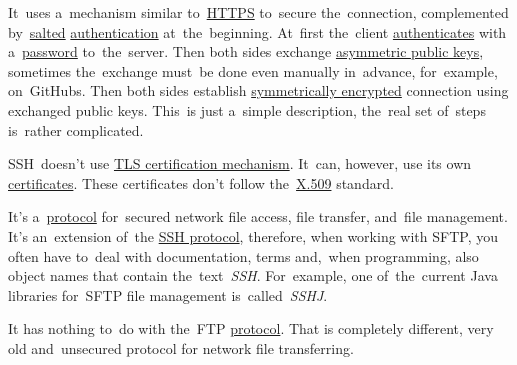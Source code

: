 It~uses a~mechanism similar to~\hyperref[https]{HTTPS} to~secure the~connection, complemented by~\hyperref[salt]{salted} \hyperref[authenticationauthorization]{authentication} at~the~beginning.
At~first the~client \hyperref[authenticationauthorization]{authenticates} with a~\hyperref[keypassword]{password} to~the~server.
Then both sides exchange \hyperref[asymmetriccryptography]{asymmetric public keys}, sometimes the~exchange must~be done even manually in~advance, for~example, on~GitHubs.
Then both sides establish \hyperref[symmetriccryptography]{symmetrically encrypted} connection using exchanged public keys.
This~is just a~simple description, the~real set of~steps is~rather complicated.

SSH~doesn't use \hyperref[tls]{TLS certification mechanism}.
It~can, however, use its own \hyperref[certificate]{certificates}.
These certificates don't follow the~\hyperref[x509]{\mbox{X.509}} standard.

\label{sftp}
It's a~\hyperref[protocolstandard]{protocol} for~secured network file access, file transfer, and~file management.
It's an~extension of~the \hyperref[ssh]{SSH protocol}, therefore, when working with SFTP, you often have to~deal with documentation, terms and,~when programming, also object names that contain the~text~\textit{SSH}.
For~example, one of~the~current Java libraries for~SFTP file management is~called~\textit{SSHJ}.

\warning It has nothing to~do with the~FTP \hyperref[protocolstandard]{protocol}.
That is completely different, very old and~unsecured protocol for network file transferring.
